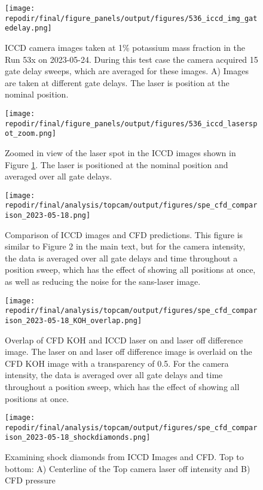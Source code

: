 \begin{figure}
    \centering
    \texttt{[image: \\repodir/final/figure\_panels/output/figures/536\_iccd\_img\_gatedelay.png]} 
    \caption{ICCD camera images taken at 1\% potassium mass fraction in the Run 53x on 2023-05-24. During this test case the camera acquired 15 gate delay sweeps, which are averaged for these images. A) Images are taken at different gate delays. The laser is position at the nominal position. }
    \label{fig:SI_536_iccd}
\end{figure}


\begin{figure}
    \centering
    \texttt{[image: \\repodir/final/figure\_panels/output/figures/536\_iccd\_laserspot\_zoom.png]} 
    \caption{Zoomed in view of the laser spot in the ICCD images shown in Figure \ref{fig:SI_536_iccd}. The laser is positioned at the nominal position and averaged over all gate delays.}
    \label{fig:SI_536_iccd_laserspot_zoom}
\end{figure}


\begin{figure}[]
\centering
\texttt{[image: \\repodir/final/analysis/topcam/output/figures/spe\_cfd\_comparison\_2023-05-18.png]}
\caption{Comparison of ICCD images and CFD predictions. This figure is similar to Figure 2 in the main text, but for the camera intensity, the data is averaged over all gate delays and time throughout a position sweep, which has the effect of showing all positions at once, as well as reducing the noise for the sans-laser image.}
\label{fig:SI_iccd_cfd_comparison}
\end{figure}


\begin{figure}[]
\centering
\texttt{[image: \\repodir/final/analysis/topcam/output/figures/spe\_cfd\_comparison\_2023-05-18\_KOH\_overlap.png]}
\caption{Overlap of CFD KOH and ICCD laser on and laser off difference image. The laser on and laser off difference image is overlaid on the CFD KOH image with a transparency of 0.5. For the camera intensity, the data is averaged over all gate delays and time throughout a position sweep, which has the effect of showing all positions at once.}
\label{fig:SI_iccd_cfd_comparison_KOH_overlap}
\end{figure}

\begin{figure}
    \centering
    \texttt{[image: \\repodir/final/analysis/topcam/output/figures/spe\_cfd\_comparison\_2023-05-18\_shockdiamonds.png]} 
    \caption{Examining shock diamonds from ICCD Images and CFD. Top to bottom: A) Centerline of the Top camera laser off intensity and B) CFD pressure}
    \label{fig:SI_iccd_cfd_comparison_KOH}
\end{figure}

